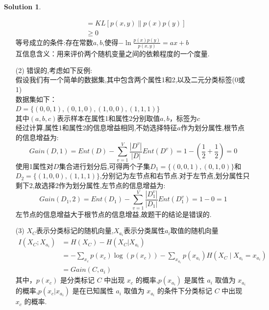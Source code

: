 \documentclass[a4paper,UTF8]{article}
\numberwithin{equation}{section}
\theoremstyle{definition}
\newtheorem*{solution}{Solution}
\begin{document}
\begin{solution}
\begin{enumerate}
\[\begin{aligned}
		& = K L[p(x,y) \| p(x)p(y)]\\
		& \geqslant 0
	\end{aligned}
\]
等号成立的条件:存在常数$a, b$,使得$-\ln \frac{p(x)p(y)}{p(x,y)}=ax+b$\\
互信息含义：用来评价两个随机变量之间的依赖程度的一个度量.\\
	\item[(2)]
错误的,考虑如下反例:\\
假设我们有一个简单的数据集,其中包含两个属性1和2,以及二元分类标签(0或1)\\
数据集如下：\\
$D = \{(0, 0, 1), (0, 1, 0), (1, 0, 0), (1, 1, 1)\}$ \\
其中$(a,b,c)$表示样本在属性1和属性2分别取值$a, b$，标签为$c$\\
经过计算,属性1和属性2的信息增益相同,不妨选择特征$a$作为划分属性,根节点的信息增益为:
$$
Gain(D,1)=Ent(D) - \sum_{v=1}^V \frac{ |D^v| }{ | D | }Ent(D^v) = 1 - (\frac{1}{2} + \frac{1}{2}) = 0
$$
使用1属性对$D$集合进行划分后,可得两个子集$D_1=\{(0,0,1),(0,1,0)\}$和$D_2=\{(1,0,0),(1,1,1)\}$,分别记为左节点和右节点.对于左节点,划分属性只剩下2,故选择2作为划分属性,左节点的信息增益为:
$$
Gain(D_1,2)=Ent(D_1) - \sum_{v=1}^V \frac{ |D_1^v| }{ | D_1 | }Ent(D_1^v) = 1 - 0 = 1
$$
左节点的信息增益大于根节点的信息增益,故题干的结论是错误的.\\
	\item[(3)]
	$X_C$表示分类标记的随机向量,$X_{a_i}$表示分类属性$a_i$取值的随机向量\\
\[
	\begin{aligned}
		I(X_C;X_{a_i}) & = H(X_C) - H(X_C|X_{a_i}) \\
		& = -\sum_{x_c} p(x_c) \log (p(x_c))-\sum_{x_{a_i}} p(x_{a_i}) H(X_C \mid X_{a_i}=x_{a_i}) \\
		& = Gain(C,a_i)
	\end{aligned}
\]
其中，$p(x_c)$ 是分类标记 $C$ 中出现 $x_c$ 的概率,$p(x_{a_i})$ 是属性 $a_i$ 取值为 $x_{a_i}$ 的概率,$p(x_c | x_{a_i})$ 是在已知属性 $a_i$ 取值为 $x_{a_i}$ 的条件下分类标记 $C$ 中出现 $x_c$ 的概率.


\end{enumerate}
\end{solution}
\end{document}
